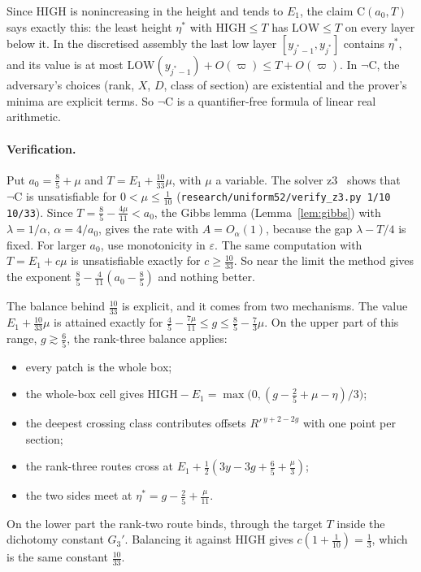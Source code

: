 \documentclass[aps,prx,twocolumn,superscriptaddress,nofootinbib,longbibliography]{revtex4-2}
\theoremstyle{plain}
\theoremstyle{definition}
\theoremstyle{remark}
\begin{document}
Since $\mathrm{HIGH}$ is nonincreasing in the height and tends to $E_1$, the claim $\mathrm C(a_0,T)$ says
exactly this: the least height $\eta^*$ with $\mathrm{HIGH}\le T$ has $\mathrm{LOW}\le T$ on every layer
below it. In the discretised assembly the last low layer $[y_{j^*-1},y_{j^*}]$ contains $\eta^*$, and its value is at most $\mathrm{LOW}(y_{j^*-1})+O(\varpi)\le T+O(\varpi)$. In $\neg\mathrm C$, the adversary's choices (rank, $X$, $D$, class of section) are existential and the
prover's minima are explicit terms. So $\neg\mathrm C$ is a quantifier-free formula of linear real
arithmetic.

\paragraph{Verification.} Put $a_0=\tfrac85+\mu$ and $T=E_1+\tfrac{10}{33}\mu$, with $\mu$ a variable.
The solver z3~\cite{Z3} shows that $\neg\mathrm C$ is unsatisfiable for $0<\mu\le\tfrac1{10}$
(\texttt{research/uniform52/verify\_z3.py 1/10 10/33}). Since $T=\tfrac85-\tfrac{4\mu}{11}<a_0$, the Gibbs lemma
(Lemma~\ref{lem:gibbs}) with $\lambda=1/\alpha$, $\alpha=4/a_0$, gives the rate with $A=O_\alpha(1)$, because the gap $\lambda-T/4$ is fixed. For larger
$a_0$, use monotonicity in $\varepsilon$. The same computation with $T=E_1+c\mu$ is unsatisfiable exactly
for $c\ge\tfrac{10}{33}$. So near the limit the method gives the exponent $\tfrac85-\tfrac4{11}(a_0-\tfrac85)$
and nothing better.

The balance behind $\tfrac{10}{33}$ is explicit, and it comes from two mechanisms.
The value $E_1+\tfrac{10}{33}\mu$ is attained exactly for $\tfrac45-\tfrac{7\mu}{11}\le g\le\tfrac85-\tfrac73\mu$.
On the upper part of this range, $g\gtrsim\tfrac65$, the rank-three balance applies:
\begin{itemize}\setlength\itemsep{0pt}
\item every patch is the whole box;
\item the whole-box cell gives $\mathrm{HIGH}-E_1=\max\big(0,(g-\tfrac25+\mu-\eta)/3\big)$;
\item the deepest crossing class contributes offsets $R'^{\,y+2-2g}$ with one point per section;
\item the rank-three routes cross at $E_1+\tfrac12(3y-3g+\tfrac65+\tfrac\mu3)$;
\item the two sides meet at $\eta^*=g-\tfrac25+\tfrac\mu{11}$.
\end{itemize}
On the lower part the rank-two route binds, through the target $T$ inside the dichotomy constant $G_3'$.
Balancing it against $\mathrm{HIGH}$ gives $c(1+\tfrac1{10})=\tfrac13$, which is the same constant $\tfrac{10}{33}$.
\end{document}
